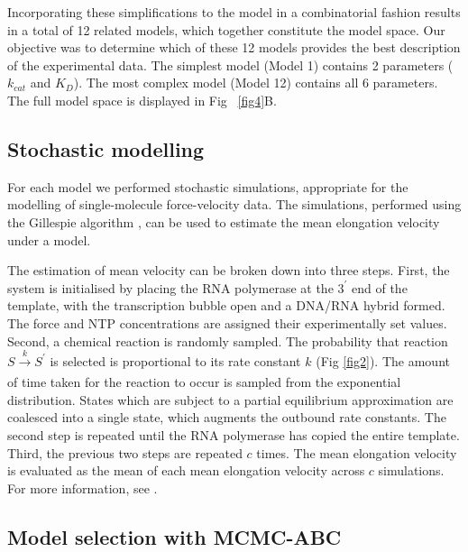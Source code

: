 \documentclass[10pt,letterpaper]{article}
\begin{document}
Incorporating these simplifications to the model in a combinatorial fashion results in a total of 12 related models, which together constitute the model space. Our objective was to determine which of these 12 models provides the best description of the experimental data. The simplest model (Model 1) contains 2 parameters ($k_{cat}$ and $K_D$). The most complex model (Model 12) contains all 6 parameters. The full model space is displayed in Fig ~\ref{fig4}B. \\ 






\subsection*{Stochastic modelling}


For each model we performed stochastic simulations, appropriate for the modelling of single-molecule force-velocity data. The simulations, performed using the Gillespie algorithm \cite{gillespie1977exact, lecca2013stochastic}, can be used to estimate the mean elongation velocity under a model.



The estimation of mean velocity can be broken down into three steps. First, the system is initialised by placing the RNA polymerase at the $3^\prime$ end of the template, with the transcription bubble open and a DNA/RNA hybrid formed. The force and NTP concentrations are assigned their experimentally set values. Second, a chemical reaction is randomly sampled. The probability that reaction $S \xrightarrow[]{k} S^\prime$ is selected is proportional to its rate constant $k$ (Fig \ref{fig2}).  The amount of time taken for the reaction to occur is sampled from the exponential distribution. States which are subject to a partial equilibrium approximation are coalesced into a single state, which augments the outbound rate constants. The second step is repeated until the RNA polymerase has copied the entire template. Third, the previous two steps are repeated $c$ times. The mean elongation velocity is evaluated as the mean of each mean elongation velocity across $c$ simulations. For more information, see .\\



\subsection*{Model selection with MCMC-ABC}
\end{document}
